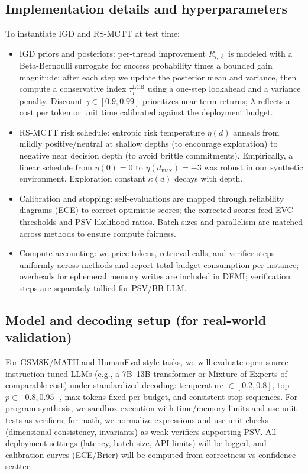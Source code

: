 \subsection{Implementation details and hyperparameters}
To instantiate IGD and RS-MCTT at test time:
\begin{itemize}[leftmargin=1.6em, itemsep=0.2em]
\item IGD priors and posteriors: per-thread improvement $R_{i,\ell}$ is modeled with a Beta-Bernoulli surrogate for success probability times a bounded gain magnitude; after each step we update the posterior mean and variance, then compute a conservative index $\tau_i^{\text{LCB}}$ using a one-step lookahead and a variance penalty. Discount $\gamma\in[0.9,0.99]$ prioritizes near-term returns; $\lambda$ reflects a cost per token or unit time calibrated against the deployment budget.
\item RS-MCTT risk schedule: entropic risk temperature $\eta(d)$ anneals from mildly positive/neutral at shallow depths (to encourage exploration) to negative near decision depth (to avoid brittle commitments). Empirically, a linear schedule from $\eta(0)=0$ to $\eta(d_\text{max})=-3$ was robust in our synthetic environment. Exploration constant $\kappa(d)$ decays with depth.
\item Calibration and stopping: self-evaluations are mapped through reliability diagrams (ECE) to correct optimistic scores; the corrected scores feed EVC thresholds and PSV likelihood ratios. Batch sizes and parallelism are matched across methods to ensure compute fairness.
\item Compute accounting: we price tokens, retrieval calls, and verifier steps uniformly across methods and report total budget consumption per instance; overheads for ephemeral memory writes are included in DEMI; verification steps are separately tallied for PSV/BB-LLM.
\end{itemize}

\subsection{Model and decoding setup (for real-world validation)}
For GSM8K/MATH and HumanEval-style tasks, we will evaluate open-source instruction-tuned LLMs (e.g., a 7B--13B transformer or Mixture-of-Experts of comparable cost) under standardized decoding: temperature $\in[0.2,0.8]$, top-$p\in[0.8,0.95]$, max tokens fixed per budget, and consistent stop sequences. For program synthesis, we sandbox execution with time/memory limits and use unit tests as verifiers; for math, we normalize expressions and use unit checks (dimensional consistency, invariants) as weak verifiers supporting PSV. All deployment settings (latency, batch size, API limits) will be logged, and calibration curves (ECE/Brier) will be computed from correctness vs confidence scatter.

